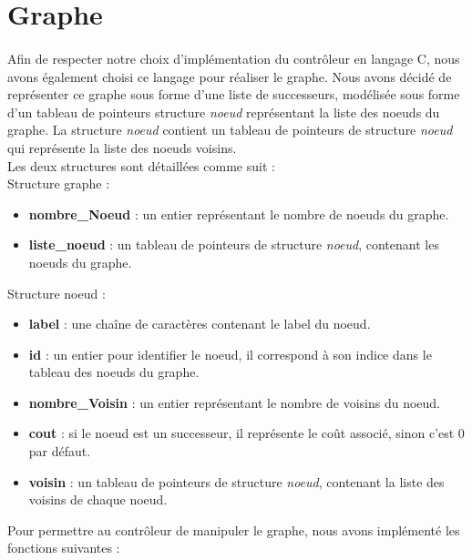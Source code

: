 \section{Graphe}
\paragraph{}Afin de respecter notre choix d'implémentation du contrôleur en langage C, nous avons également choisi ce langage pour réaliser le graphe. Nous avons décidé de représenter ce graphe sous forme d'une liste de successeurs, modélisée sous
forme d'un tableau de pointeurs structure \textit{noeud} représentant la liste
des noeuds du graphe. La structure \textit{noeud} contient un tableau de
pointeurs de structure \textit{noeud} qui représente la liste des noeuds voisins.
\\
\newline Les deux structures sont détaillées comme suit : 
\\
Structure graphe :
\begin{itemize}	
\item \textbf{nombre\_Noeud} : un entier représentant le nombre de noeuds du graphe.
\item \textbf{liste\_noeud}  : un tableau de pointeurs de structure \textit{noeud}, contenant les noeuds du graphe.
\end{itemize}
\vspace{1em}
Structure noeud :
\begin{itemize}
\item \textbf{label}   		: une chaîne de caractères contenant le label du noeud.
\item \textbf{id}    	     	: un entier pour identifier le noeud, il correspond à son indice dans le tableau des noeuds du graphe.
\item \textbf{nombre\_Voisin} : un entier représentant le nombre de voisins du noeud.
\item \textbf{cout}          : si le noeud est un successeur, il représente le coût associé, sinon c'est 0 par défaut.
\item \textbf{voisin}        : un tableau de pointeurs de structure \textit{noeud}, contenant la liste des voisins de chaque noeud.
\end{itemize}

\vspace{1em}
\noindent{}
Pour permettre au contrôleur de manipuler le graphe, nous avons
implémenté les fonctions suivantes :

